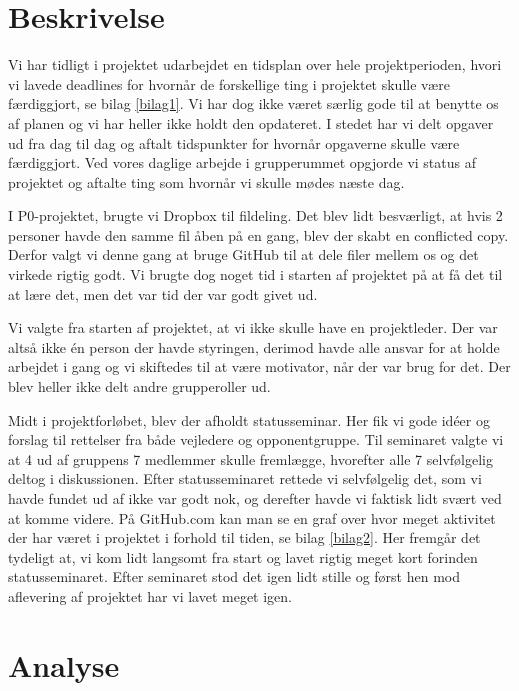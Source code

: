 \section{Beskrivelse}
Vi har tidligt i projektet udarbejdet en tidsplan over hele projektperioden, hvori vi lavede deadlines for hvornår de forskellige ting i projektet skulle være færdiggjort, se bilag \ref{bilag1}. Vi har dog ikke været særlig gode til at benytte os af planen og vi har heller ikke holdt den opdateret. I stedet har vi delt opgaver ud fra dag til dag og aftalt tidspunkter for hvornår opgaverne skulle være færdiggjort. Ved vores daglige arbejde i grupperummet opgjorde vi status af projektet og aftalte ting som hvornår vi skulle mødes næste dag. 

I P0-projektet, brugte vi Dropbox til fildeling. Det blev lidt besværligt, at hvis 2 personer havde den samme fil åben på en gang, blev der skabt en conflicted copy. Derfor valgt vi denne gang at bruge GitHub til at dele filer mellem os og det virkede rigtig godt. Vi brugte dog noget tid i starten af projektet på at få det til at lære det, men det var tid der var godt givet ud. 

Vi valgte fra starten af projektet, at vi ikke skulle have en projektleder. Der var altså ikke én person der havde styringen, derimod havde alle ansvar for at holde arbejdet i gang og vi skiftedes til at være motivator, når der var brug for det. Der blev heller ikke delt andre grupperoller ud.  

Midt i projektforløbet, blev der afholdt statusseminar. Her fik vi gode idéer og forslag til rettelser fra både vejledere og opponentgruppe. Til seminaret valgte vi at 4 ud af gruppens 7 medlemmer skulle fremlægge, hvorefter alle 7 selvfølgelig deltog i diskussionen. Efter statusseminaret rettede vi selvfølgelig det, som vi havde fundet ud af ikke var godt nok, og derefter havde vi faktisk lidt svært ved at komme videre. På GitHub.com kan man se en graf over hvor meget aktivitet der har været i projektet i forhold til tiden, se bilag \ref{bilag2}. Her fremgår det tydeligt at, vi kom lidt langsomt fra start og lavet rigtig meget kort forinden statusseminaret. Efter seminaret stod det igen lidt stille og først hen mod aflevering af projektet har vi lavet meget igen. 

\section{Analyse}

